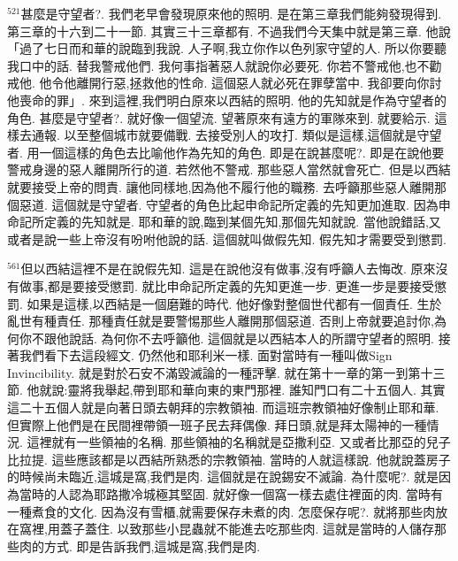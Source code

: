 \documentclass{book}
\begin{document}
$^{521}$甚麼是守望者?.
我們老早會發現原來他的照明.
是在第三章我們能夠發現得到.
第三章的十六到二十一節.
其實三十三章都有.
不過我們今天集中就是第三章.
他說「過了七日而和華的說臨到我說.
人子啊,我立你作以色列家守望的人.
所以你要聽我口中的話.
替我警戒他們.
我何事指著惡人就說你必要死.
你若不警戒他,也不勸戒他.
他令他離開行惡,拯救他的性命.
這個惡人就必死在罪孽當中.
我卻要向你討他喪命的罪」.
來到這裡,我們明白原來以西結的照明.
他的先知就是作為守望者的角色.
甚麼是守望者?.
就好像一個望流.
望著原來有遠方的軍隊來到.
就要給示.
這樣去通報.
以至整個城市就要備戰.
去接受別人的攻打.
類似是這樣,這個就是守望者.
用一個這樣的角色去比喻他作為先知的角色.
即是在說甚麼呢?.
即是在說他要警戒身邊的惡人離開所行的道.
若然他不警戒.
那些惡人當然就會死亡.
但是以西結就要接受上帝的問責.
讓他同樣地,因為他不履行他的職務.
去呼籲那些惡人離開那個惡道.
這個就是守望者.
守望者的角色比起申命記所定義的先知更加進取.
因為申命記所定義的先知就是.
耶和華的說,臨到某個先知,那個先知就說.
當他說錯話,又或者是說一些上帝沒有吩咐他說的話.
這個就叫做假先知.
假先知才需要受到懲罰.

$^{561}$但以西結這裡不是在說假先知.
這是在說他沒有做事,沒有呼籲人去悔改.
原來沒有做事,都是要接受懲罰.
就比申命記所定義的先知更進一步.
更進一步是要接受懲罰.
如果是這樣,以西結是一個磨難的時代.
他好像對整個世代都有一個責任.
生於亂世有種責任.
那種責任就是要警惕那些人離開那個惡道.
否則上帝就要追討你,為何你不跟他說話.
為何你不去呼籲他.
這個就是以西結本人的所謂守望者的照明.
接著我們看下去這段經文.
仍然他和耶利米一樣.
面對當時有一種叫做Sign Invincibility.
就是對於石安不滿毀滅論的一種評擊.
就在第十一章的第一到第十三節.
他就說:靈將我舉起,帶到耶和華向東的東門那裡.
誰知門口有二十五個人.
其實這二十五個人就是向著日頭去朝拜的宗教領袖.
而這班宗教領袖好像制止耶和華.
但實際上他們是在民間裡帶領一班子民去拜偶像.
拜日頭,就是拜太陽神的一種情況.
這裡就有一些領袖的名稱.
那些領袖的名稱就是亞撒利亞.
又或者比那亞的兒子比拉提.
這些應該都是以西結所熟悉的宗教領袖.
當時的人就這樣說.
他就說蓋房子的時候尚未臨近,這城是窩,我們是肉.
這個就是在說錫安不滅論.
為什麼呢?.
就是因為當時的人認為耶路撒冷城極其堅固.
就好像一個窩一樣去處住裡面的肉.
當時有一種煮食的文化.
因為沒有雪櫃,就需要保存未煮的肉.
怎麼保存呢?.
就將那些肉放在窩裡,用蓋子蓋住.
以致那些小昆蟲就不能進去吃那些肉.
這就是當時的人儲存那些肉的方式.
即是告訴我們,這城是窩,我們是肉.
\end{document}
